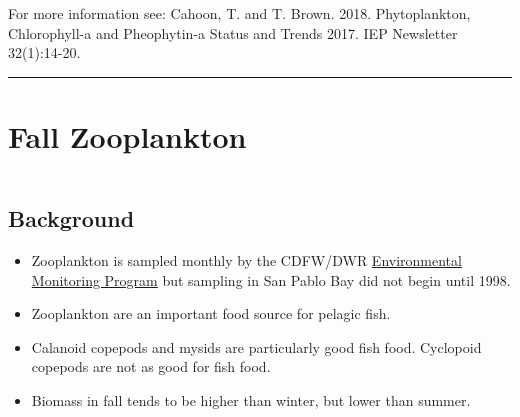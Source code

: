 \documentclass[
]{book}
\providecommand{\tightlist}{%
  \setlength{\itemsep}{0pt}\setlength{\parskip}{0pt}}
\begin{document}
\begin{disclaimer}
For more information see: Cahoon, T. and T. Brown. 2018. Phytoplankton,
Chlorophyll-a and Pheophytin-a Status and Trends 2017. IEP Newsletter
32(1):14-20.
\end{disclaimer}

\begin{center}\rule{0.5\linewidth}{0.5pt}\end{center}

\hypertarget{fall-zooplankton}{%
\section{Fall Zooplankton}\label{fall-zooplankton}}

\begin{column}{0.7\textwidth}
\hypertarget{background-15}{%
\subsection{Background}\label{background-15}}

\begin{itemize}
\tightlist
\item
  Zooplankton is sampled monthly by the CDFW/DWR \href{https://emp.baydeltalive.com/wiki/12297}{Environmental Monitoring Program} but sampling in San Pablo Bay did not begin until 1998.
\item
  Zooplankton are an important food source for pelagic fish.
\item
  Calanoid copepods and mysids are particularly good fish food. Cyclopoid copepods are not as good for fish food.
\item
  Biomass in fall tends to be higher than winter, but lower than summer.
\end{itemize}
\end{column}
\end{document}
